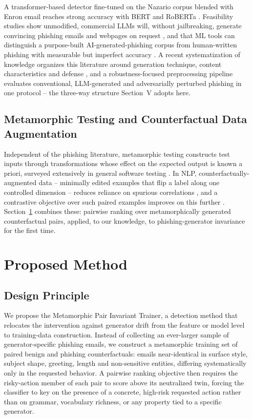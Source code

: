 \documentclass[conference]{IEEEtran}
\begin{document}
A transformer-based detector fine-tuned on the Nazario corpus blended with Enron email reaches strong accuracy with BERT and RoBERTa \cite{otieno2023bert}. Feasibility studies show unmodified, commercial LLMs will, without jailbreaking, generate convincing phishing emails and webpages on request \cite{sroy2023phishbots}, and that ML tools can distinguish a purpose-built AI-generated-phishing corpus from human-written phishing with measurable but imperfect accuracy \cite{eze2024aiphishing}. A recent systematization of knowledge organizes this literature around generation technique, content characteristics and defense \cite{chen2025sok}, and a robustness-focused preprocessing pipeline evaluates conventional, LLM-generated and adversarially perturbed phishing in one protocol \cite{kulal2025robust} -- the three-way structure Section~V adopts here.

\subsection{Metamorphic Testing and Counterfactual Data Augmentation}

Independent of the phishing literature, metamorphic testing constructs test inputs through transformations whose effect on the expected output is known a priori, surveyed extensively in general software testing \cite{chen2018metamorphic,segura2016survey}. In NLP, counterfactually-augmented data -- minimally edited examples that flip a label along one controlled dimension -- reduces reliance on spurious correlations \cite{kaushik2020counterfactual}, and a contrastive objective over such paired examples improves on this further \cite{qiu2024paircfr}. Section~\ref{sec:method} combines these: pairwise ranking over metamorphically generated counterfactual pairs, applied, to our knowledge, to phishing-generator invariance for the first time.

\section{Proposed Method}
\label{sec:method}

\subsection{Design Principle}

We propose the Metamorphic Pair Invariant Trainer, a detection method that relocates the intervention against generator drift from the feature or model level to training-data construction. Instead of collecting an ever-larger sample of generator-specific phishing emails, we construct a metamorphic training set of paired benign and phishing counterfactuals: emails near-identical in surface style, subject shape, greeting, length and non-sensitive entities, differing systematically only in the requested behavior. A pairwise ranking objective then requires the risky-action member of each pair to score above its neutralized twin, forcing the classifier to key on the presence of a concrete, high-risk requested action rather than on grammar, vocabulary richness, or any property tied to a specific generator.
\end{document}
